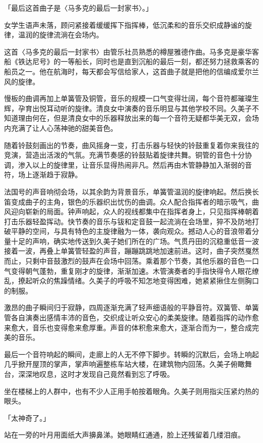\documentclass[UTF8]{ctexart}
\begin{document}
    「最后这首曲子是〈马多克的最后一封家书〉。」 

    女学生语声未落，顾问紧接着缓缓挥下指挥棒，低沉柔和的音乐交织成静谧的旋律，温润的旋律流淌在会场内。 

    这首〈马多克的最后一封家书〉由管乐社员熟悉的樽屋雅德作曲。马多克是豪华客船《铁达尼号》的一等船长，同时也是直到沉船的最后一刻，都还努力拯救乘客的船员之一。他在航海时，每天都会写信给家人，这首曲子就是把他的信编成爱尔兰风的旋律。 

    慢板的曲调再加上单簧管及铜管，音乐的规模一口气变得壮阔，每个音符都璀璨生辉，孕育出悦耳动听的旋律。清良女中演奏的音乐明显与其他学校不同。久美子不知道理由何在，但是清良女中的乐器释放出来的每一个音符无疑都华美无双，会场内充满了让人心荡神驰的甜美音色。 

    随着铃鼓刻画出的节奏，曲风摇身一变，打击乐器与轻快的铃鼓重复着你来我往的竞演，营造出活泼的气氛。充满节奏感的铃鼓贴着旋律共舞。铜管的音色十分协调，渗入以上的旋律里，让音乐显得热闹非凡。然后再由木管静静加入渐弱的音符，场上逐渐趋于寂静。 

    法国号的声音响彻会场，以其余韵为背景音乐，单簧管温润的旋律响起。然后换长笛变成曲子的主角，银色的乐器织出忧伤的曲调。众人配合指挥者的暗示吸气，曲风迎向崭新的局面。钟声响起，众人的视线都集中在指挥者身上，只见指挥棒朝着打击乐器轻盈挥动。快节奏的音乐与钹和定音鼓一起流淌在会场里，猝不及防地打破平静的空间，与具有特色的主旋律融为一体，袭向观众。撼动人心的音浪带着分量十足的声响，确实地传送到久美子她们所在的广场。气贯丹田的沉稳重低音一波接着一波，再叠上单簧管轻盈的声音，蹦蹦跳跳地加速前进。这时，曲子突然戛然而止，只剩中音鼓激烈的鼓声在会场中回荡。乘着那个节奏，其他乐器的音色一口气变得朝气蓬勃，重复刚才的旋律，渐渐加速。木管演奏者的手指快得令人眼花缭乱，撩起听众的焦躁情绪。久美子的呼吸不知怎地变得困难，她紧紧揪住左侧胸口的制服。 

    激昂的曲子瞬间归于寂静，四周逐渐充满了轻声细语般的平静音符。双簧管、单簧管各自演奏出感情丰沛的音色，交织成让听众安心的柔美旋律。随着指挥的动作愈来愈大，音乐也变得愈来愈厚重。声音的体积愈来愈大，逐渐合而为一，整合成完美的音乐。 

    最后一个音符响起的瞬间，走廊上的人无不停下脚步。转瞬的沉默后，会场上响起几乎掀开屋顶的掌声，掌声响遍整栋车站大楼，在建筑物内回荡。久美子俯瞰舞台，深深地叹息，这时才发现自己竟然看到忘了呼吸。 

    坐在楼梯上的人群中，也有不少人正用手帕按着眼角。久美子则用指尖压紧灼热的眼头。 

    「太神奇了。」 

    站在一旁的叶月用面纸大声擤鼻涕。她眼睛红通通，脸上还残留着几缕泪痕。 
\end{document}
